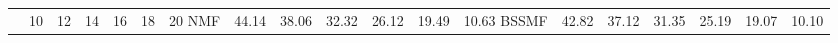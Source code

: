 \begin{table}
\centering
	\begin{tabular}{ccccccc}
		 & 10 & 12 & 14 & 16 & 18 & 20
		 NMF & 44.14 & 38.06 & 32.32 & 26.12 & 19.49 & 10.63
		 BSSMF & 42.82 & 37.12 & 31.35 & 25.19 & 19.07 & 10.10
	\end{tabular}
\end{table}
